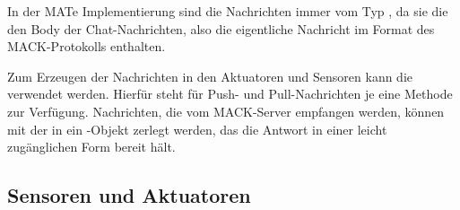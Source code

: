 In der MATe Implementierung sind die Nachrichten immer vom Typ , da sie die den Body der Chat-Nachrichten, also die eigentliche Nachricht im Format des MACK-Protokolls enthalten.

Zum Erzeugen der Nachrichten in den Aktuatoren und Sensoren kann die  verwendet werden. Hierfür steht für Push- und Pull-Nachrichten je eine Methode zur Verfügung. Nachrichten, die vom MACK-Server empfangen werden, können mit der  in ein -Objekt zerlegt werden, das die Antwort in einer leicht zugänglichen Form bereit hält.

\subsection{Sensoren und Aktuatoren}\label{subsec:real_sensors}




